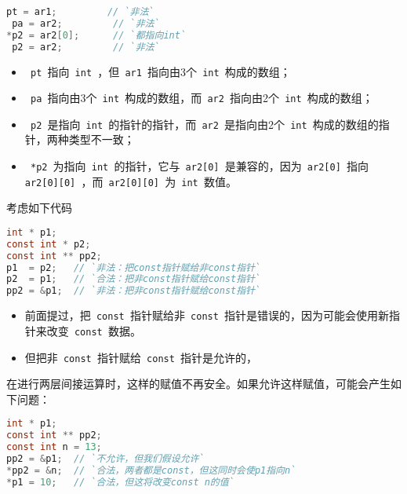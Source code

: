 \begin{frame}[fragile]
\begin{lstlisting}[language=c,backgroundcolor=\color{red!20}]
 pt = ar1;         // `非法`
 pa = ar2;         // `非法`
*p2 = ar2[0];      // `都指向int` 
 p2 = ar2;         // `非法`
\end{lstlisting}
\begin{itemize}
\item
\lstinline| pt |指向\lstinline| int |，但\lstinline| ar1 |指向由3个\lstinline| int |构成的数组；
\item
\lstinline| pa |指向由3个\lstinline| int |构成的数组，而\lstinline| ar2 |指向由2个\lstinline| int |构成的数组；
\item
\lstinline| p2 |是指向\lstinline| int |的指针的指针，而\lstinline| ar2 |是指向由2个\lstinline| int |构成的数组的指针，两种类型不一致；
\item
\lstinline| *p2 |为指向\lstinline| int |的指针，它与\lstinline| ar2[0] |是兼容的，因为\lstinline| ar2[0] |指向\lstinline| ar2[0][0] |，而\lstinline| ar2[0][0] |为\lstinline| int |数值。
\end{itemize}
\end{frame}

\begin{frame}[fragile]
考虑如下代码
\begin{lstlisting}[language=c,backgroundcolor=\color{red!20}]
int * p1;
const int * p2;
const int ** pp2;
p1  = p2;   // `非法：把const指针赋给非const指针`
p2  = p1;   // `合法：把非const指针赋给const指针`
pp2 = &p1;  // `非法：把非const指针赋给const指针`
\end{lstlisting}
\begin{itemize}
\item
前面提过，把\lstinline| const |指针赋给非\lstinline| const |指针是错误的，因为可能会使用新指针来改变\lstinline| const |数据。
\item
但把非\lstinline| const |指针赋给\lstinline| const |指针是允许的，
\end{itemize}
\end{frame}

\begin{frame}[fragile]
在进行两层间接运算时，这样的赋值不再安全。如果允许这样赋值，可能会产生如下问题：
\begin{lstlisting}[language=c,backgroundcolor=\color{red!20}]
int * p1;
const int ** pp2;
const int n = 13;
pp2 = &p1;  // `不允许，但我们假设允许`
*pp2 = &n;  // `合法，两者都是const，但这同时会使p1指向n`
*p1 = 10;   // `合法，但这将改变const n的值`
\end{lstlisting}
\end{frame}

